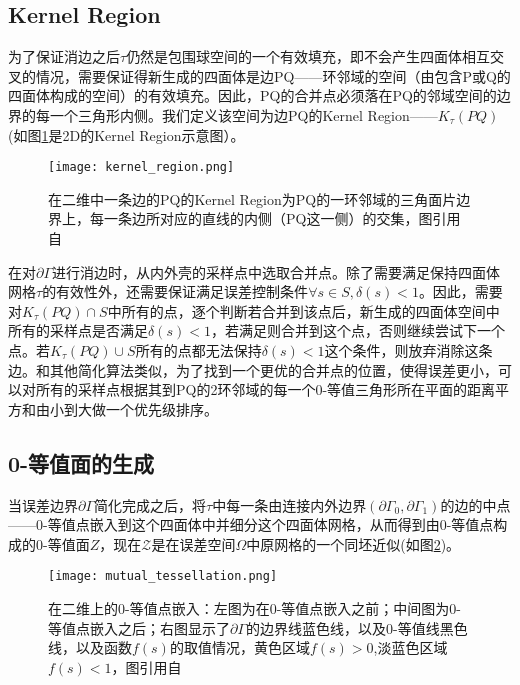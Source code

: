 \subsection{Kernel Region}
为了保证消边之后$\tau$仍然是包围球空间的一个有效填充，即不会产生四面体相互交叉的情况，需要保证得新生成的四面体是边PQ——环邻域的空间（由包含P或Q的四面体构成的空间）的有效填充。因此，PQ的合并点必须落在PQ的邻域空间的边界的每一个三角形内侧。我们定义该空间为边PQ的Kernel Region——$K_\tau(PQ)$(如图\ref{fig:kernel-region}是2D的Kernel Region示意图）。
\begin{figure}[htbp]
    \centering
    \texttt{[image: kernel\_region.png]}
    \caption[2D Kernel Region]{在二维中一条边的PQ的Kernel Region为PQ的一环邻域的三角面片边界上，每一条边所对应的直线的内侧（PQ这一侧）的交集，图引用自\cite{isotopic-appro}}
    \label{fig:kernel-region}
\end{figure}
\par 在对$\partial \Gamma$进行消边时，从内外壳的采样点中选取合并点。除了需要满足保持四面体网格$\tau$的有效性外，还需要保证满足误差控制条件$\forall s \in S, \delta(s) < 1$。因此，需要对$K_\tau (PQ) \cap S$中所有的点，逐个判断若合并到该点后，新生成的四面体空间中所有的采样点是否满足$\delta(s) < 1$，若满足则合并到这个点，否则继续尝试下一个点。若$K_\tau (PQ) \cup S$所有的点都无法保持$\delta(s) < 1$这个条件，则放弃消除这条边。和其他简化算法类似，为了找到一个更优的合并点的位置，使得误差更小，可以对所有的采样点根据其到PQ的2环邻域的每一个0-等值三角形所在平面的距离平方和由小到大做一个优先级排序。
\subsection{0-等值面的生成}
当误差边界$\partial \Gamma$简化完成之后，将$\tau$中每一条由连接内外边界$(\partial \Gamma_0, \partial \Gamma_1)$的边的中点——0-等值点嵌入到这个四面体中并细分这个四面体网格，从而得到由0-等值点构成的0-等值面$\mathcal{Ζ}$，现在$\mathcal{Z}$是在误差空间$\Omega$中原网格的一个同坯近似(如图\ref{fig:mutual-tessellation})。
\begin{figure}[htbp]
    \centering
    \texttt{[image: mutual\_tessellation.png]}
    \caption[Mutual tessellation]{在二维上的0-等值点嵌入：左图为在0-等值点嵌入之前；中间图为0-等值点嵌入之后；右图显示了$\partial \Gamma$的边界线蓝色线，以及0-等值线黑色线，以及函数$f(s)$的取值情况，黄色区域$f(s) > 0$,淡蓝色区域$f(s) < 1$，图引用自\cite{isotopic-appro}}
    \label{fig:mutual-tessellation}
\end{figure}

